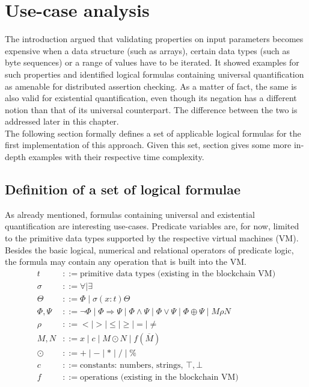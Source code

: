 \chapter{Use-case analysis}\label{chap:use_cases}
The introduction argued that validating properties on input parameters becomes expensive when a data structure (such as arrays), certain data types (such as byte sequences) or a range of values have to be iterated. It showed examples for such properties and identified logical formulas containing universal quantification as amenable for distributed assertion checking. As a matter of fact, the same is also valid for existential quantification, even though its negation has a different notion than that of its universal counterpart. The difference between the two is addressed later in this chapter. \\
The following section formally defines a set of applicable logical formulas for the first implementation of this approach. Given this set, section  gives some more in-depth examples with their respective time complexity. 

\section{Definition of a set of logical formulae}\label{sec:formulae}
As already mentioned, formulas containing universal and existential quantification are interesting use-cases. Predicate variables are, for now, limited to the primitive data types supported by the respective virtual machines (VM). Besides the basic logical, numerical and relational operators of predicate logic, the formula may contain any operation that is built into the VM.
\begin{align*}
    t &::= \text{primitive data types (existing in the blockchain VM)} \\
    \sigma &::= \forall \mid \exists \\
    \Theta &::= \Phi \mid \sigma (x:t) \Theta \\
    \Phi,\Psi &::= \neg\Phi \mid \Phi \Rightarrow \Psi \mid \Phi\wedge\Psi \mid
    				\Phi\vee\Psi \mid \Phi \oplus \Psi \mid M \rho N \\
    \rho &::= < \mid > \mid \le \mid \ge \mid = \mid \ne \\
    M, N &::= x \mid c \mid M \odot N  \mid f (\overline M) \\
    \odot &::= +\mid -\mid * \mid / \mid \% \\
    c &::= \text{constants: numbers, strings, } \top, \bot \\
    f &::= \text{operations (existing in the blockchain VM)}
\end{align*}
\begingroup\vspace*{-\baselineskip}
\vspace*{\baselineskip}\endgroup


